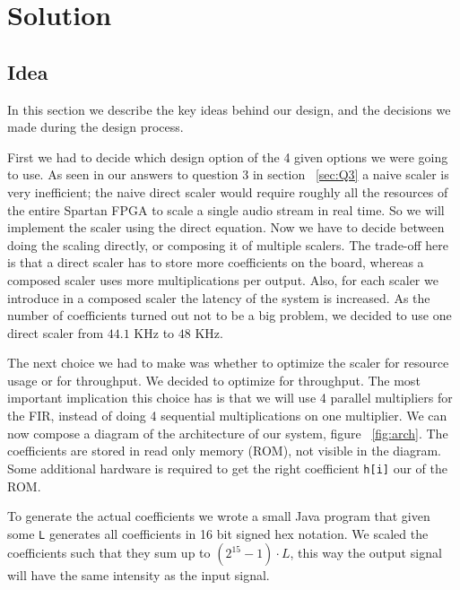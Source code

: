 \section{Solution}
\subsection{Idea}
In this section we describe the key ideas behind our design, and the decisions we made during the design process.

First we had to decide which design option of the 4 given options we were going to use. As seen in our answers to question 3 in section ~\ref{sec:Q3} a naive scaler is very inefficient; the naive direct scaler would require roughly all the resources of the entire Spartan FPGA to scale a single audio stream in real time. So we will implement the scaler using the direct equation. Now we have to decide between doing the scaling directly, or composing it of multiple scalers. The trade-off here is that a direct scaler has to store more coefficients on the board, whereas a composed scaler uses more multiplications per output. Also, for each scaler we introduce in a composed scaler the latency of the system is increased. As the number of coefficients turned out not to be a big problem, we decided to use one direct scaler from $44.1$ KHz to $48$ KHz.

The next choice we had to make was whether to optimize the scaler for resource usage or for throughput. We decided to optimize for throughput. The most important implication this choice has is that we will use 4 parallel multipliers for the FIR, instead of doing 4 sequential multiplications on one multiplier. We can now compose a diagram of the architecture of our system, figure ~\ref{fig:arch}. The coefficients are stored in read only memory (ROM), not visible in the diagram. Some additional hardware is required to get the right coefficient \texttt{h[i]} our of the ROM.

To generate the actual coefficients we wrote a small Java program that given some \texttt{L} generates all coefficients  in 16 bit signed hex notation. We scaled the coefficients such that they sum up to $(2^{15}-1)\cdot L$, this way the output signal will have the same intensity as the input signal.

